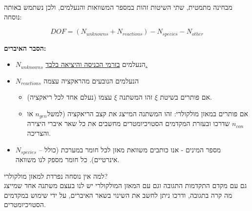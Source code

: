 \documentclass[
  hebrew,
  letterpaper,
  DIV=11,
  numbers=noendperiod]{scrreprt}
\begin{document}
מבחינה מתמטית, שתי השיטות זהות במספר המשוואות והנעלמים, ולכן נשתמש באותה
נוסחה:

\[DOF = \left( N_{unknowns} + N_{reactions} \right) - N_{species} - N_{other}\]

\textbf{הסבר האיברים:}

\begin{itemize}
\item
  \(N_{unknowns}\) הנעלמים \ul{בזרמי הכניסה והיציאה בלבד.}
\item
  \(N_{reactions}\) הנעלמים הנובעים מהראקציה עצמה

  \begin{itemize}
  \item
    אם פותרים בשיטת \(\xi\) זהו המשתנה \(\xi\) עצמו (נעלם אחד לכל
    ריאקציה).
  \item
    אם פותרים במאזן מולקולרי: זהו המשתנה המייצג את קצב הריאקציה
    (למשל\(n_{gen}\) או \(n_{con}\) שדרכו ובעזרת המקדמים הסטויכיומטרים
    מחשבים את כל שאר איברי היצירה והצריכה.
  \end{itemize}
\item
  \(N_{species}\) -- מספר המינים - אנו כותבים משוואת מאזן לכל חומר
  במערכת (כולל אינרטיים). כל חומר מספק לנו משוואה.
\end{itemize}

\begin{tcolorbox}[enhanced jigsaw, colback=white, arc=.35mm, coltitle=black, breakable, toptitle=1mm, leftrule=.75mm, colbacktitle=quarto-callout-tip-color!10!white, opacitybacktitle=0.6, bottomtitle=1mm, titlerule=0mm, opacityback=0, colframe=quarto-callout-tip-color-frame, title=\textcolor{quarto-callout-tip-color}{\faLightbulb}\hspace{0.5em}{עצה}, rightrule=.15mm, bottomrule=.15mm, toprule=.15mm, left=2mm]

למה אין נוסחה נפרדת למאזן מולקולרי?\\
גם עם מקדם התקדמות התגובה וגם עם המאזן המולקולרי יש לנו בעצם משתנה אחד
שמייצג מה קרה בתגובה, ודרכו ניתן לחשב את השינוי בשאר האיברים, על ידי
שימוש במקדמים הסטויכיומטרים.

\end{tcolorbox}
\end{document}
